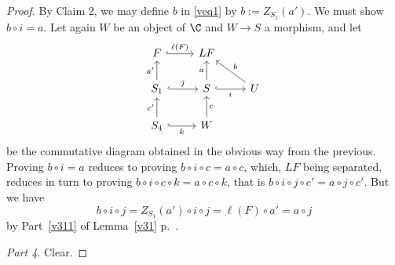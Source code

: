 \documentclass[12pt]{article}
\theoremstyle{remark}
\theoremstyle{definition}
\begin{document}
\begin{proof}
By Claim 2, we may define $b$ in \eqref{veq1} by $b:=Z_{S_1}(a')$. We must show $b\circ i=a$. Let again $W$ be an object of $\C$ and $W\to S$ a morphism, and let 
$$
\begin{tikzcd}
F\ar[r,hookrightarrow,"\ell(F)"]&LF\\ 
S_1\ar[u,"a'"]\ar[r,hookrightarrow,"j"]&S\ar[u,"a"]\ar[r,hookrightarrow,"i"']&U\ar[lu,"b"']\\ 
S_4\ar[u,"c'"]\ar[r,hookrightarrow,"k"']&W\ar[u,"c"']
\end{tikzcd}
$$ 
be the commutative diagram obtained in the obvious way from the previous. Proving $b\circ i=a$ reduces to proving $b\circ i\circ c=a\circ c$, which, $LF$ being separated, reduces in turn to proving $b\circ i\circ c\circ k=a\circ c\circ k$, that is $b\circ i\circ j\circ c'=a\circ j\circ c'$. But we have 
$$
b\circ i\circ j=Z_{S_1}(a')\circ i\circ j=\ell(F)\circ a'=a\circ j
$$ 
by Part~\ref{v311} of Lemma~\ref{v31} p.~\pageref{v31}.

\nn\emph{Part 4}. Clear.%
\end{proof}
\end{document}
